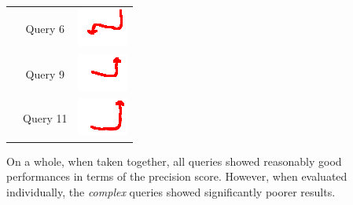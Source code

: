 \begin{table}[!tb]
\begin{tabular}{|c|c|c|}
 & Query 6 & \includegraphics{image/minimaps/query_06.png} \\ \cline{2-3}
 & Query 9 & \includegraphics{image/minimaps/query_09.png} \\ \cline{2-3}
 & Query 11 & \includegraphics{image/minimaps/query_11.png} \\ \hline
\end{tabular}
\label{table:versionTwoComplexSimple}
\end{table}
On a whole, when taken together, all queries showed reasonably good performances in terms of the precision score. However, when evaluated individually, the \textit{complex} queries showed significantly poorer results. 


